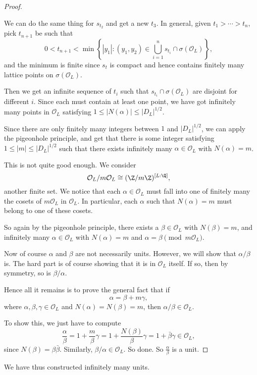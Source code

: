 \documentclass[a4paper]{article}
\begin{document}
\begin{proof}
\begin{center}
  \end{center}
  We can do the same thing for $s_{t_2}$ and get a new $t_3$. In general, given $t_1 > \cdots > t_n$, pick $t_{n + 1}$ be such that
  \[
    0 < t_{n + 1} < \min\left\{|y_1|: (y_1, y_2) \in \bigcup_{i = 1}^n s_{t_i} \cap \sigma(\mathcal{O}_L)\right\},
  \]
  and the minimum is finite since $s_t$ is compact and hence contains finitely many lattice points on $\sigma(\mathcal{O}_L)$.

  Then we get an infinite sequence of $t_i$ such that $s_{t_i} \cap \sigma(\mathcal{O}_L)$ are disjoint for different $i$. Since each must contain at least one point, we have got infinitely many points in $\mathcal{O}_L$ satisfying $1 \leq |N(\alpha)| \leq |D_L|^{1/2}$.

  Since there are only finitely many integers between $1$ and $|D_L|^{1/2}$, we can apply the pigeonhole principle, and get that there is some integer satisfying $1 \leq |m| \leq |D_L|^{1/2}$ such that there exists infinitely many $\alpha \in \mathcal{O}_L$ with $N(\alpha) = m$.

  This is not quite good enough. We consider
  \[
    \mathcal{O}_L/m\mathcal{O}_L \cong (\Z/m\Z)^{[L:\Q]},
  \]
  another finite set. We notice that each $\alpha \in \mathcal{O}_L$ must fall into one of finitely many the cosets of $m\mathcal{O}_L$ in $\mathcal{O}_L$. In particular, each $\alpha$ such that $N(\alpha) = m$ must belong to one of these cosets.

  So again by the pigeonhole principle, there exists a $\beta \in \mathcal{O}_L$ with $N(\beta) = m$, and infinitely many $\alpha \in \mathcal{O}_L$ with $N(\alpha) = m$ and $\alpha = \beta \pmod {m\mathcal{O}_L}$.

  Now of course $\alpha$ and $\beta$ are not necessarily units. However, we will show that $\alpha/\beta$ is. The hard part is of course showing that it is in $\mathcal{O}_L$ itself. If so, then by symmetry, so is $\beta/\alpha$.

  Hence all it remains is to prove the general fact that if
  \[
    \alpha = \beta + m\gamma,
  \]
  where $\alpha, \beta, \gamma \in \mathcal{O}_L$ and $N(\alpha) = N(\beta) = m$, then $\alpha/\beta \in \mathcal{O}_L$.

  To show this, we just have to compute
  \[
    \frac{\alpha}{\beta} = 1 + \frac{m}{\beta}\gamma = 1 + \frac{N(\beta)}{\beta}\gamma = 1 + \bar{\beta} \gamma \in \mathcal{O}_L,
  \]
  since $N(\beta) = \beta\bar{\beta}$. Similarly, $\beta/\alpha \in \mathcal{O}_L$. So done. So $\frac{\alpha}{\beta}$ is a unit.
\end{proof}
We have thus constructed infinitely many units.
\end{document}
